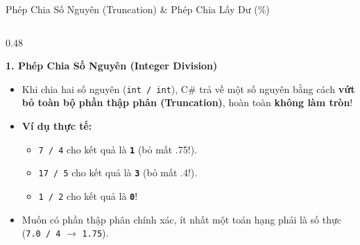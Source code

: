 \documentclass[aspectratio=169, 10pt]{beamer}
\begin{document}
\begin{frame}{Phép Chia Số Nguyên (Truncation) \& Phép Chia Lấy Dư (\%)}
  \begin{columns}[T]
    \begin{column}{0.48\textwidth}
      \begin{alertblock}{\textbf{1. Phép Chia Số Nguyên (Integer Division)}}
        \begin{itemize}\small
          \item Khi chia hai số nguyên (\texttt{int / int}), C\# trả về một số nguyên bằng cách \textbf{vứt bỏ toàn bộ phần thập phân (Truncation)}, hoàn toàn \textbf{không làm tròn}!
          \item \textbf{Ví dụ thực tế:}
            \begin{itemize}\small
              \item \texttt{7 / 4} cho kết quả là \textbf{\texttt{1}} (bỏ mất .75!).
              \item \texttt{17 / 5} cho kết quả là \textbf{\texttt{3}} (bỏ mất .4!).
              \item \texttt{1 / 2} cho kết quả là \textbf{\texttt{0}}!
            \end{itemize}
          \item Muốn có phần thập phân chính xác, ít nhất một toán hạng phải là số thực (\texttt{7.0 / 4} $\to$ \texttt{1.75}).
        \end{itemize}
      \end{alertblock}
    \end{column}


\end{columns}
\end{frame}
\end{document}
